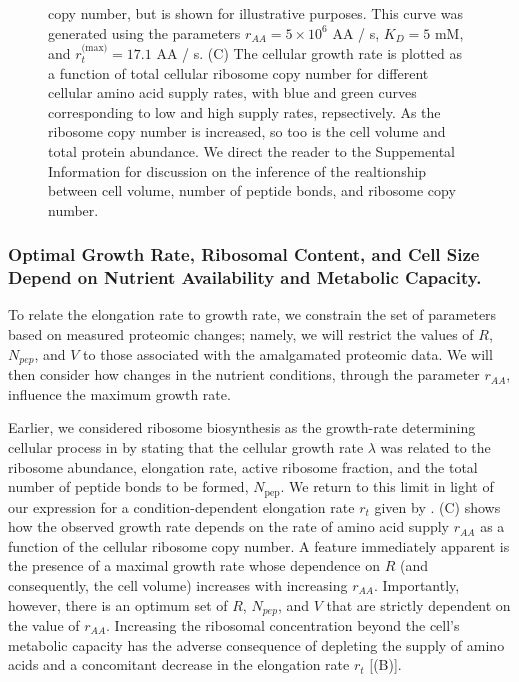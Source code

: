 {\begin{figure}
{{        copy number, but is shown for illustrative purposes. This curve was
        generated using the parameters $r_{AA} = 5 \times 10^6$ AA / s, $K_D =
        5$ mM, and $r_t^\text{(max)} = 17.1$ AA / s. (C) The cellular growth
        rate is plotted as a function of total cellular ribosome copy number for
        different cellular amino acid supply rates, with blue and green curves
        corresponding to low and high supply rates, repsectively. As the
        ribosome copy number is increased, so too is the cell volume and total
        protein abundance. We direct the reader to the Suppemental Information
        for discussion  on the inference of the realtionship between cell
        volume, number of peptide bonds, and ribosome copy number.}
        \label{fig:elongation_rate_model}
    }
\end{figure}

\subsubsection{Optimal Growth Rate, Ribosomal Content, and Cell Size Depend on Nutrient
Availability and Metabolic Capacity.}

To relate the elongation rate to growth rate, we constrain  the set of
parameters based on measured proteomic changes; namely, we will restrict the
values of $R$, $N_{pep}$, and $V$ to those associated with the amalgamated
proteomic data. We will then consider how changes in the nutrient conditions,
through the parameter $r_{AA}$, influence the maximum growth rate.

Earlier, we considered ribosome biosynthesis as the growth-rate determining
cellular process in  by stating that the cellular growth rate
$\lambda$ was related to the ribosome abundance, elongation rate, active
ribosome fraction, and the total number of peptide bonds to be formed,
$N_\text{pep}$. We return to this limit in light of our expression for a
condition-dependent elongation rate $r_t$ given by .
(C) shows how the observed growth rate depends on the
rate of amino acid supply $r_{AA}$ as a function of the cellular ribosome copy
number. A feature immediately apparent is the presence of a maximal growth rate
whose dependence on $R$ (and consequently, the cell volume) increases with
increasing $r_{AA}$. Importantly, however, there is an optimum set of $R$,
$N_{pep}$, and $V$ that are strictly dependent on the value of $r_{AA}$.
Increasing the ribosomal concentration beyond the cell's metabolic capacity has
the adverse consequence of depleting the supply of amino acids and a concomitant
decrease in the elongation rate $r_t$ [(B)].

}
